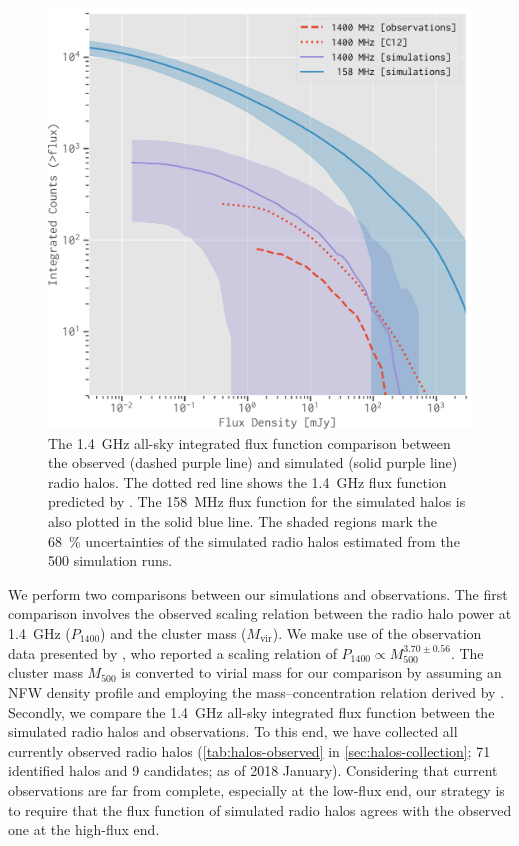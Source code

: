 \documentclass[twocolumn]{aastex62}
\newcommand{\R}[1]{\mathrm{#1}}
\newcommand{\editone}[1]{{\leavevmode\color{cyan}#1}}
\begin{document}
\begin{figure}
  \centering
  \includegraphics[width=\columnwidth]{fluxfunc-simucomp}
  \caption{\label{fig:halos-simucomp}%
    The \SI{1.4}{\GHz} all-sky integrated flux function comparison
    between the observed (dashed purple line) and simulated
    (solid purple line) radio halos.
    \editone{The dotted red line shows the \SI{1.4}{\GHz} flux function
    predicted by \citet{cassano2012}.}
    The \SI{158}{\MHz} flux function for the simulated halos is also
    plotted in the solid blue line.
    The shaded regions mark the \SI{68}{\percent} uncertainties of the
    simulated radio halos estimated from the 500 simulation runs.
  }
\end{figure}

\editone{%
We perform two comparisons between our simulations and observations.
The first comparison involves the observed scaling relation between the
radio halo power at \SI{1.4}{\GHz} ($P_{1400}$) and the cluster mass
($M_{\R{vir}}$).
We make use of the observation data presented by \citet{cassano2013},
who reported a scaling relation of
$P_{1400} \propto M_{500}^{3.70 \pm 0.56}$.
The cluster mass $M_{500}$ is converted to virial mass for our comparison
by assuming an NFW density profile \citep{navarro1997} and employing the
mass--concentration relation derived by \citet{duffy2008}.
Secondly,}
we compare the \SI{1.4}{\GHz} all-sky integrated flux function between
the simulated radio halos and observations.
To this end, we have collected all currently observed radio halos
(\autoref{tab:halos-observed} in \autoref{sec:halos-collection};
71 identified halos and 9 candidates; as of 2018 January).
Considering that current observations are far from complete,
especially at the low-flux end, our strategy is to require that the
flux function of simulated radio halos agrees with the
observed one at the high-flux end.
\end{document}
